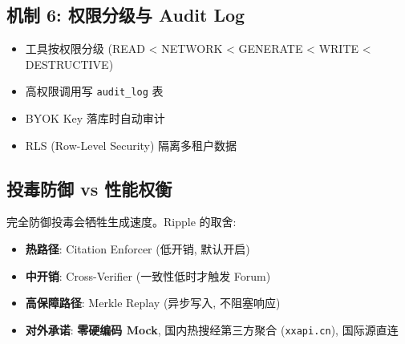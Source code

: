 \subsection{机制 6: 权限分级与 Audit Log}

\begin{itemize}
    \item 工具按权限分级 (READ < NETWORK < GENERATE < WRITE < DESTRUCTIVE)
    \item 高权限调用写 \texttt{audit\_log} 表
    \item BYOK Key 落库时自动审计
    \item RLS (Row-Level Security) 隔离多租户数据
\end{itemize}

\subsection{投毒防御 vs 性能权衡}

\begin{insight}
完全防御投毒会牺牲生成速度。Ripple 的取舍:
\begin{itemize}
    \item \textbf{热路径}: Citation Enforcer (低开销, 默认开启)
    \item \textbf{中开销}: Cross-Verifier (一致性低时才触发 Forum)
    \item \textbf{高保障路径}: Merkle Replay (异步写入, 不阻塞响应)
    \item \textbf{对外承诺}: \textbf{零硬编码 Mock}, 国内热搜经第三方聚合 (\texttt{xxapi.cn}), 国际源直连
\end{itemize}
\end{insight}
